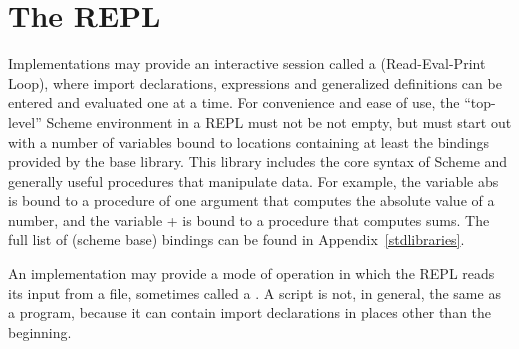\section{The REPL}

Implementations may provide an interactive session called a
 (Read-Eval-Print Loop), where import declarations,
expressions and generalized definitions can be
entered and evaluated one at a time.  For convenience and ease of use,
the ``top-level'' Scheme environment in a REPL
must not be not empty, but must start out with a number of variables
bound to locations containing at least the bindings provided by the
base library.  This library includes the core syntax of Scheme
and generally useful procedures that manipulate data.  For example, the
variable {\cf abs} is bound to a
procedure of one argument that computes the absolute value of a
number, and the variable {\cf +} is bound to a procedure that computes
sums.  The full list of {\cf(scheme base)} bindings can be found in
Appendix~\ref{stdlibraries}.

An implementation may provide a mode of operation in which the REPL
reads its input from a file, sometimes called a .  A script is not, in general, the same
as a program, because it can contain import declarations in places other than
the beginning.

